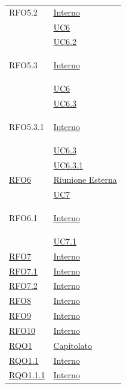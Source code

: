 \begin{longtable}{|>{\centering}m{5cm}|m{5cm}<{\centering}|}
\hypertarget{RFO5.2}{RFO5.2} &  \hyperlink{Interno}{Interno}\\
& \hyperref[UC6]{UC6}\\
& \hyperref[UC6.2]{UC6.2}\\ \hline

\hypertarget{RFO5.3}{RFO5.3} &  \hyperlink{Interno}{Interno}\\
& \hyperref[UC6]{UC6}\\
& \hyperref[UC6.3]{UC6.3}\\ \hline

\hypertarget{RFO5.3.1}{RFO5.3.1} &  \hyperlink{Interno}{Interno}\\
& \hyperref[UC6.3]{UC6.3}\\
& \hyperref[UC6.3.1]{UC6.3.1}\\ \hline

\hyperlink{RFO6}{RFO6} & \hyperlink{Riunione Esterna}{Riunione Esterna}\\
& \hyperref[UC7]{UC7}\\ \hline

\hypertarget{RFO6.1}{RFO6.1} & \hyperlink{Interno}{Interno}\\
& \hyperref[UC7.1]{UC7.1}\\ \hline

\hyperlink{RFO7}{RFO7} & \hyperlink{Interno}{Interno}\\\hline

\hyperlink{RFO7.1}{RFO7.1} & \hyperlink{Interno}{Interno}\\\hline

\hyperlink{RFO7.2}{RFO7.2} & \hyperlink{Interno}{Interno}\\\hline

\hyperlink{RFO8}{RFO8} & \hyperlink{Interno}{Interno}\\\hline

\hyperlink{RFO9}{RFO9} & \hyperlink{Interno}{Interno}\\\hline

\hyperlink{RFO10}{RFO10} & \hyperlink{Interno}{Interno}\\\hline

\hyperlink{RQO1}{RQO1} & \hyperlink{Capitolato}{Capitolato}\\ \hline

\hyperlink{RQO1.1}{RQO1.1} & \hyperlink{Interno}{Interno}\\ \hline

\hyperlink{RQO1.1.1}{RQO1.1.1} & \hyperlink{Interno}{Interno}\\ \hline


\end{longtable}

